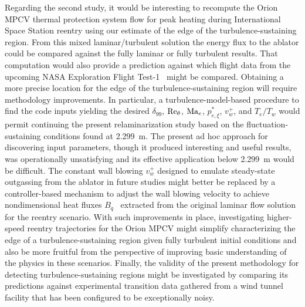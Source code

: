 Regarding the second study, it would be interesting to recompute the Orion MPCV
thermal protection system flow for peak heating during International Space
Station reentry using our estimate of the edge of the turbulence-sustaining
region.  From this mixed laminar/turbulent solution the energy flux to the
ablator could be compared against the fully laminar or fully turbulent results.
That computation would also provide a
prediction against which flight data from the upcoming NASA Exploration Flight
Test-1~\citep{SpaceCom20140317} might be compared.
%
Obtaining a more precise location for the edge of the turbulence-sustaining
region will require methodology improvements.
%
In particular, a turbulence-model-based procedure to find the code inputs
yielding the desired $\delta_{99}$, $\Reynolds[\theta]{}$, $\Mach[e]{}$,
$p_{e,\xi}^{\ast}$, $v_w^{+}$, and $T_e/T_w$ would permit continuing the present
relaminarization study based on the fluctuation-sustaining conditions found at 2.299~m.
%
The present ad hoc approach for discovering input parameters, though it produced
interesting and useful results, was operationally unsatisfying and its effective
application below 2.299~m would be difficult.
%
The constant wall blowing $v_w^{+}$ designed to emulate steady-state
outgassing from the ablator in future studies might better be replaced
by a controller-based mechanism to adjust the wall blowing velocity to
achieve nondimensional heat fluxes $B_q$~\citep{Bradshaw1977Compressible}
extracted from the original laminar flow solution for the reentry
scenario.
%
With such improvements in place, investigating higher-speed reentry trajectories
for the Orion MPCV might simplify characterizing the edge of a
turbulence-sustaining region given fully turbulent initial
conditions and also be more fruitful from the perspective of improving basic
understanding of the physics in these scenarios.
%
Finally, the validity of the present methodology for detecting
turbulence-sustaining regions might be investigated by comparing its predictions
against experimental transition data gathered from a wind tunnel facility that
has been configured to be exceptionally noisy.
%
\enlargethispage{1.0em}

